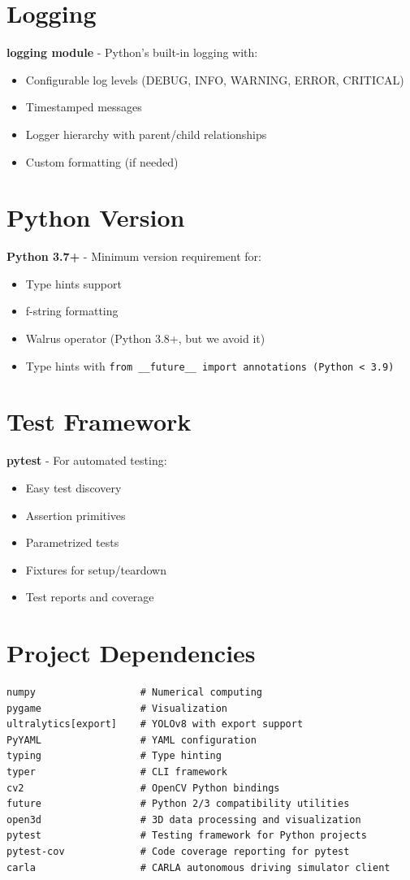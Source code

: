 \section{Logging}

\textbf{logging module} - Python's built-in logging with:
\begin{itemize}
    \item Configurable log levels (DEBUG, INFO, WARNING, ERROR, CRITICAL)
    \item Timestamped messages
    \item Logger hierarchy with parent/child relationships
    \item Custom formatting (if needed)
\end{itemize}

\section{Python Version}

\textbf{Python 3.7+} - Minimum version requirement for:
\begin{itemize}
    \item Type hints support
    \item f-string formatting
    \item Walrus operator (Python 3.8+, but we avoid it)
    \item Type hints with \verb|from __future__ import annotations (Python < 3.9)|
    
    
\end{itemize}

\section{Test Framework}

\textbf{pytest} - For automated testing:
\begin{itemize}
    \item Easy test discovery
    \item Assertion primitives
    \item Parametrized tests
    \item Fixtures for setup/teardown
    \item Test reports and coverage
\end{itemize}

\section{Project Dependencies}

\begin{verbatim}
numpy                  # Numerical computing
pygame                 # Visualization
ultralytics[export]    # YOLOv8 with export support
PyYAML                 # YAML configuration
typing                 # Type hinting
typer                  # CLI framework
cv2                    # OpenCV Python bindings
future                 # Python 2/3 compatibility utilities
open3d                 # 3D data processing and visualization
pytest                 # Testing framework for Python projects
pytest-cov             # Code coverage reporting for pytest
carla                  # CARLA autonomous driving simulator client
\end{verbatim}